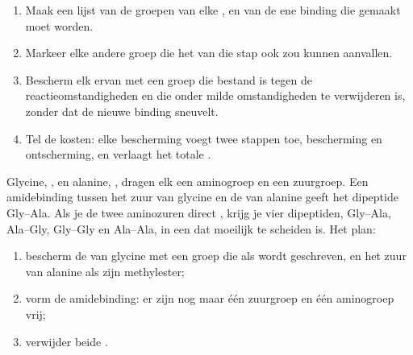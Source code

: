 \begin{method}\label{met:g12:synthesis-strategy:plan}
\begin{enumerate}
  \item Maak een lijst van de groepen van elke , en van de ene
        binding die gemaakt moet worden.
  \item Markeer elke andere groep die het  van die stap ook zou
        kunnen aanvallen.
  \item Bescherm elk ervan met een groep die bestand is tegen de
        reactieomstandigheden en die onder milde omstandigheden te
        verwijderen is, zonder dat de nieuwe binding sneuvelt.
  \item Tel de kosten: elke bescherming voegt twee stappen toe,
        bescherming en ontscherming, en verlaagt het totale .
\end{enumerate}
\end{method}

\begin{example}\label{ex:g12:synthesis-strategy:dipeptide}
Glycine, , en alanine, , dragen elk
een aminogroep en een zuurgroep. Een amidebinding tussen het zuur van
glycine en de  van alanine geeft het dipeptide Gly--Ala. Als je de
twee aminozuren direct , krijg je vier dipeptiden, Gly--Ala,
Ala--Gly, Gly--Gly en Ala--Ala, in een  dat moeilijk te scheiden
is. Het plan:
\begin{enumerate}
  \item bescherm de  van glycine met een groep die als  wordt
        geschreven, en het zuur van alanine als zijn methylester;
  \item vorm de amidebinding: er zijn nog maar één zuurgroep en één
        aminogroep vrij;
  \item verwijder beide .
\end{enumerate}
\end{example}

